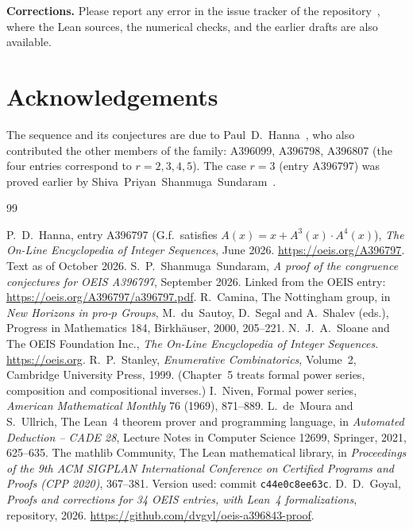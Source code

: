 \documentclass[11pt,a4paper]{article}
\theoremstyle{definition}
\theoremstyle{remark}
\newcommand{\para}[1]{\par\medskip\noindent\textbf{#1}\enspace}
\begin{document}
\para{Corrections.} Please report any error in the issue tracker of the repository~\cite{repo}, where the Lean
sources, the numerical checks, and the earlier drafts are also available.

\section*{Acknowledgements}
The sequence and its conjectures are due to Paul~D.~Hanna~\cite{oeis}, who also contributed the other members of the
family: A396099, A396798, A396807 (the four entries correspond to $r=2,3,4,5$). The case $r=3$ (entry A396797) was
proved earlier by Shiva~Priyan~Shanmuga~Sundaram~\cite{sundaram}. 

\begin{thebibliography}{99}\small
\raggedright
{} P.~D.~Hanna, entry A396797 (G.f.\ satisfies $A(x)=x+A^{3}(x)\cdot A^{4}(x)$), \emph{The On-Line Encyclopedia of Integer Sequences}, June 2026. \url{https://oeis.org/A396797}. Text as of October 2026.
 S.~P.~Shanmuga~Sundaram, \emph{A proof of the congruence conjectures for OEIS A396797}, September 2026. Linked from the OEIS entry: \url{https://oeis.org/A396797/a396797.pdf}.
 R.~Camina, The Nottingham group, in \emph{New Horizons in pro-$p$ Groups}, M.~du~Sautoy, D.~Segal and A.~Shalev (eds.), Progress in Mathematics 184, Birkh\"auser, 2000, 205--221.
 N.~J.~A.~Sloane and The OEIS Foundation Inc., \emph{The On-Line Encyclopedia of Integer Sequences}. \url{https://oeis.org}.
 R.~P.~Stanley, \emph{Enumerative Combinatorics}, Volume~2, Cambridge University Press, 1999. (Chapter~5 treats formal power series, composition and compositional inverses.)
 I.~Niven, Formal power series, \emph{American Mathematical Monthly} 76 (1969), 871--889.
 L.~de~Moura and S.~Ullrich, The Lean~4 theorem prover and programming language, in \emph{Automated Deduction -- CADE 28}, Lecture Notes in Computer Science 12699, Springer, 2021, 625--635.
 The mathlib Community, The Lean mathematical library, in \emph{Proceedings of the 9th ACM SIGPLAN International Conference on Certified Programs and Proofs (CPP 2020)}, 367--381. Version used: commit \texttt{c44e0c8ee63c}.
 D.~D.~Goyal, \emph{Proofs and corrections for 34 OEIS entries, with Lean~4 formalizations}, repository, 2026. \url{https://github.com/dvgyl/oeis-a396843-proof}.
\end{thebibliography}
\end{document}
